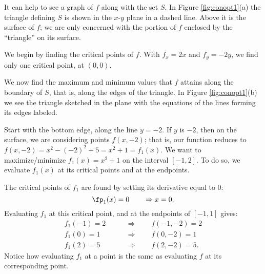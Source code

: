 {It can help to see a graph of $f$ along with the set $S$. In Figure \ref{fig:conopt1}(a) the triangle defining $S$ is shown in the $x$-$y$ plane in a dashed line. Above it is the surface of $f$; we are only concerned with the portion of $f$ enclosed by the ``triangle'' on its surface. 

We begin by finding the critical points of $f$. With $f_x = 2x$ and $f_y = -2y$, we find only one critical point, at $(0,0)$. 

We now find the maximum and minimum values that $f$ attains along the boundary of $S$, that is, along the edges of the triangle. In Figure \ref{fig:conopt1}(b) we see the triangle sketched in the plane with the equations of the lines forming its edges labeled. 

Start with the bottom edge, along the line $y=-2$. If $y$ is $-2$, then on the surface, we are considering points $f(x,-2)$; that is, our function reduces to $f(x,-2) = x^2-(-2)^2+5 = x^2+1=f_1(x)$. We want to maximize/minimize $f_1(x)=x^2+1$ on the interval $[-1,2]$. To do so, we evaluate $f_1(x)$ at its critical points and at the endpoints.
\drawexampleline

The critical points of $f_1$ are found by setting its derivative equal to 0:
$$\fp_1(x)=0\qquad \Rightarrow x=0.$$
Evaluating $f_1$ at this critical point, and at the endpoints of $[-1,1]$ gives:
\begin{align*}
f_1(-1) = 2 \qquad&\Rightarrow\qquad f(-1,-2) = 2\\
f_1(0) = 1 \qquad&\Rightarrow \qquad f(0,-2) = 1\\
f_1(2) = 5 \qquad&\Rightarrow \qquad f(2,-2) = 5.
\end{align*}
Notice how evaluating $f_1$ at a point is the same as evaluating $f$ at its corresponding point.

}
